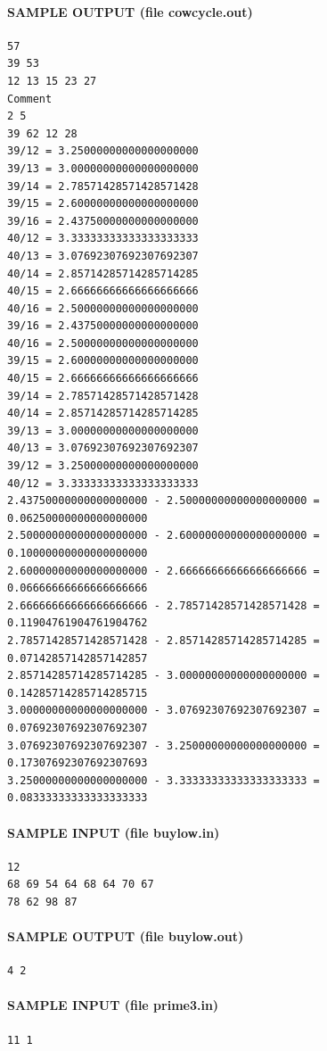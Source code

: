 \documentclass[11pt]{article}
\begin{document}
\paragraph{SAMPLE OUTPUT (file cowcycle.out)}
\begin{verbatim}
57
39 53
12 13 15 23 27
Comment
2 5
39 62 12 28
39/12 = 3.25000000000000000000
39/13 = 3.00000000000000000000
39/14 = 2.78571428571428571428
39/15 = 2.60000000000000000000
39/16 = 2.43750000000000000000
40/12 = 3.33333333333333333333
40/13 = 3.07692307692307692307
40/14 = 2.85714285714285714285
40/15 = 2.66666666666666666666
40/16 = 2.50000000000000000000
39/16 = 2.43750000000000000000
40/16 = 2.50000000000000000000
39/15 = 2.60000000000000000000
40/15 = 2.66666666666666666666
39/14 = 2.78571428571428571428
40/14 = 2.85714285714285714285
39/13 = 3.00000000000000000000
40/13 = 3.07692307692307692307
39/12 = 3.25000000000000000000
40/12 = 3.33333333333333333333
2.43750000000000000000 - 2.50000000000000000000 = 0.06250000000000000000
2.50000000000000000000 - 2.60000000000000000000 = 0.10000000000000000000
2.60000000000000000000 - 2.66666666666666666666 = 0.06666666666666666666
2.66666666666666666666 - 2.78571428571428571428 = 0.11904761904761904762
2.78571428571428571428 - 2.85714285714285714285 = 0.07142857142857142857
2.85714285714285714285 - 3.00000000000000000000 = 0.14285714285714285715
3.00000000000000000000 - 3.07692307692307692307 = 0.07692307692307692307
3.07692307692307692307 - 3.25000000000000000000 = 0.17307692307692307693
3.25000000000000000000 - 3.33333333333333333333 = 0.08333333333333333333
\end{verbatim}

\paragraph{SAMPLE INPUT (file buylow.in)}
\begin{verbatim}
12
68 69 54 64 68 64 70 67
78 62 98 87
\end{verbatim}

\paragraph{SAMPLE OUTPUT (file buylow.out)}
\begin{verbatim}
4 2
\end{verbatim}

\paragraph{SAMPLE INPUT (file prime3.in)}
\begin{verbatim}
11 1
\end{verbatim}
\end{document}

